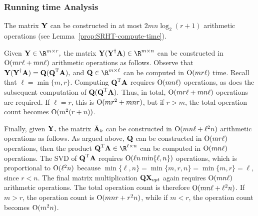 \subsubsection{Running time Analysis}
The matrix ${\bm{\mathrm{Y}}} $ can be constructed in at most $2 m n \log_2 (r+1)$ arithmetic operations (see Lemma~\ref{prop:SRHT-compute-time}).

Given $\matY \in \R^{m \times r},$ the matrix $\matY (\pinv{\matY} \matA) \in \R^{m \times n}$ can be constructed in $\mathrm{O}(m r \ell + m n \ell)$ arithmetic operations as follows.
Observe that ${\bm{\mathrm{Y}}} ({{\bm{\mathrm{Y}}}}^\dagger {\ensuremath{\bm{\mathrm{A}}}}) = {\bm{\mathrm{Q}}} ({\bm{\mathrm{Q}}}^{\textsc{T}} {\bm{\mathrm{A}}}),$ and $\matQ \in \R^{m \times \ell}$ can be computed in $\mathrm{O}(m r \ell)$ time. Recall that $\ell = \min\{m,r\}.$
Computing ${\bm{\mathrm{Q}}}^{\textsc{T}} {\bm{\mathrm{A}}}$ requires $\mathrm{O}( m n \ell)$ operations, as does the subsequent computation of ${\bm{\mathrm{Q}}} ({\bm{\mathrm{Q}}}^{\textsc{T}} {\bm{\mathrm{A}}}).$
Thus, in total, $\mathrm{O}(m r \ell + m n \ell)$ operations are required. If $\ell = r$, this is $\mathrm{O}(m r^2 + m n r)$,
but if $r > m$, the total operation count becomes $\mathrm{O}(m^2 (r  +n))$.


Finally, given ${\bm{\mathrm{Y}}},$ the matrix $\tilde{{\bm{\mathrm{A}}}}_k$ can be constructed in $\mathrm{O}(mn \ell + \ell^2 n)$ arithmetic operations as follows.
As argued above, ${\bm{\mathrm{Q}}}$ can be constructed in $\mathrm{O}(m r \ell)$ operations, then the product $\matQ\transp \matA \in \R^{\ell \times n}$
can be computed in $\mathrm{O}(m n \ell)$ operations.
The SVD of ${\bm{\mathrm{Q}}}^{\textsc{T}} {\bm{\mathrm{A}}}$ requires $\mathrm{O}( \ell n \min\{\ell,n \})$ operations,
which is proportional to  $\mathrm{O}(\ell^2 n)$ because $\min\{ \ell, n \} = \min\{m,r, n \}= \min\{m,r \} = \ell,$ since $r < n$.
The final matrix multiplication ${\bm{\mathrm{Q}}} {\bm{\mathrm{X}}}_{opt}$ again requires  $\mathrm{O}( m n \ell )$  arithmetic operations.
The total operation count is therefore $\mathrm{O}(mn \ell + \ell^2 n)$. If $m > r$, the operation count is
$\mathrm{O}(mnr + r^2 n)$, while if $m < r$, the operation count becomes $\mathrm{O}( m^2 n )$.



